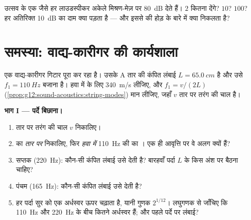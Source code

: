 \begin{exercise}[$\star\star\star$]\label{exo:g12:sound-acoustics:15}
उत्सव के एक जैसे हर लाउडस्पीकर अकेले मिश्रण-मेज़ पर \qty{80}{dB} देते हैं।
$2$ कितना देंगे? $10$? $100$? हर अतिरिक्त \qty{+10}{dB} का दाम क्या पड़ता
है --- और इससे  की होड़ के बारे में क्या निकलता है?
\end{exercise}

\section{समस्या: वाद्य-कारीगर की कार्यशाला}

\begin{problem}
\label{pb:g12:sound-acoustics:1}
एक वाद्य-कारीगर गिटार पूरा कर रहा है। उसके A तार की कंपित लंबाई $L = \qty{65.0}{cm}$ है
और उसे $f_1 = \qty{110}{Hz}$ बजाना है। हवा में  के लिए \qty{340}{m/s}
लीजिए, और $f_1 = v/(2L)$ (\cref{prop:g12:sound-acoustics:string-modes}) मान लीजिए, जहाँ $v$ तार पर तरंग
की चाल है।

\medskip
\noindent\textbf{भाग I --- पर्दे बिछाना।}
\begin{enumerate}
  \item तार पर तरंग की चाल $v$ निकालिए।
  \item {} का \emph{तार पर}  निकालिए, फिर
        \emph{हवा में} \qty{110}{Hz} की  का ।
        एक ही आवृत्ति पर वे अलग क्यों हैं?
  \item सप्तक (\qty{220}{Hz}): कौन-सी कंपित लंबाई उसे देती है? बारहवाँ पर्दा
        $L$ के किस अंश पर बैठना चाहिए?
  \item पंचम (\qty{165}{Hz}): कौन-सी कंपित लंबाई उसे देती है?
  \item हर पर्दा सुर को एक अर्धस्वर ऊपर चढ़ाता है, यानी गुणक $2^{1/12}$।
        लघुगणक से जाँचिए कि \qty{110}{Hz} और \qty{220}{Hz} के बीच कितने अर्धस्वर हैं;
        और पहले पर्दे पर लंबाई?
\end{enumerate}


\end{problem}
